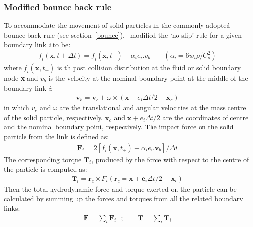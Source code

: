 \subsubsection*{Modified bounce back rule}
To accommodate the movement of solid particles in the commonly adopted bounce-back rule (see section~\ref{bounce}).~\citet{Ladd1994} modified the `no-slip' rule for a given boundary link \textit{i} to be:
\begin{align}
\textit{f}_{\textit{i}}(\mathbf{x}, t + \Delta t)=\textit{f}_{\textit{i}}(\mathbf{x}, t_{+}) - \alpha_{\textit{i}}\mathbf{\textit{e}}_{\textit{i}}.\mathbf{\textit{v}}_{b} \qquad (\alpha_{i}=6\textit{w}_{\textit{i}}\rho/\textit{C}_{\textit{s}}^{2})
\end{align}
where $\textit{f}_{\textit{i}}(\mathbf{x}, t_{+})$ is th post collision distribution at the fluid or solid boundary node \textbf{x} and $\textit{v}_{b}$ is the velocity at the nominal boundary point at the middle of the boundary link \textit{i}:
\begin{align}
\mathbf{v}_{b}=\mathbf{v}_{c}+\omega \times (\mathbf{x}+\mathbf{\textit{e}}_{\textit{i}}\Delta t /2 - \mathbf{x}_{c})
\end{align}
in which $\mathbf{\textit{v}}_{c}$ and $\omega$ are the translational and angular velocities at the mass centre of the solid particle, respectively. $\mathbf{x}_{c}$ and $\mathbf{x}+\mathbf{\textit{e}}_{\textit{i}}\Delta t /2$ are the coordinates of centre and the nominal boundary point,  respectively. The impact force on the solid particle from the link is defined as:
\begin{align}
\mathbf{F}_{\textit{i}}=2[\textit{f}_{\textit{i}} (\mathbf{x}, t_{+}) -\alpha_{\textit{i}}\mathbf{\textit{e}}_{\textit{i}}.\mathbf{v}_{b}]/ \Delta t
\end{align} 
The corresponding torque $\mathbf{T}_{\textit{i}}$, produced by the force with respect to the centre of the particle is computed as:
\begin{align}
\mathbf{T}_{\textit{i}}=\mathbf{r}_{c} \times \textit{F}_{\textit{i}} (\mathbf{r}_{c}=\mathbf{x}+\mathbf{e}_{\textit{i}} \Delta t /2 - \mathbf{x}_{c})
\end{align}
Then the total hydrodynamic force and torque exerted on the particle can be calculated by summing up the forces and torques from all the related boundary links:
\begin{align}
\mathbf{F} = \sum\limits_{\textit{i}}{\mathbf{F}_{\textit{i}}} \mbox{ }; \qquad \mathbf{T} = \sum\limits_{\textit{i}}{\mathbf{T}_{\textit{i}}}
\end{align}
